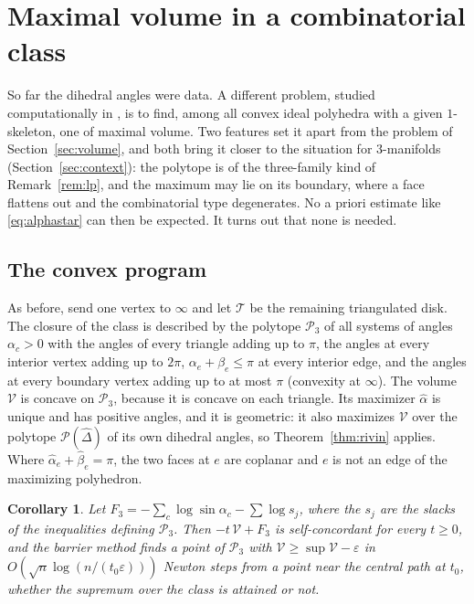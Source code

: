 \documentclass[11pt]{amsart}
\newtheorem{corollary}[theorem]{Corollary}
\theoremstyle{definition}
\theoremstyle{remark}
\newcommand{\cT}{\mathcal{T}}
\newcommand{\eps}{\varepsilon}
\begin{document}
\section{Maximal volume in a combinatorial class}\label{sec:maxvol}

So far the dihedral angles were data. A different problem, studied computationally in \cite{Riv25}, is to find, among all convex ideal polyhedra with a given $1$-skeleton, one of maximal volume.
Two features set it apart from the problem of Section~\ref{sec:volume}, and both bring it closer to the situation for $3$-manifolds (Section~\ref{sec:context}): the polytope is of the three-family kind of Remark~\ref{rem:lp}, and the maximum may lie on its boundary, where a face flattens out and the combinatorial type degenerates.
No a priori estimate like \eqref{eq:alphastar} can then be expected. It turns out that none is needed.

\subsection{The convex program}
As before, send one vertex to $\infty$ and let $\cT$ be the remaining triangulated disk. The closure of the class is described by the polytope $\mathcal P_3$ of all systems of angles $\alpha_c>0$ with the angles of every triangle adding up to $\pi$, the angles at every interior vertex adding up to $2\pi$,
$\alpha_e+\beta_e\le\pi$ at every interior edge, and the angles at every boundary vertex adding up to at most $\pi$ (convexity at $\infty$). The volume $\mathcal V$ is concave on $\mathcal P_3$, because it is concave on each triangle.
Its maximizer $\hat\alpha$ is unique and has positive angles, and it is geometric: it also maximizes $\mathcal V$ over the polytope $\mathcal P(\hat\Delta)$ of its own dihedral angles, so Theorem~\ref{thm:rivin} applies. Where $\hat\alpha_e+\hat\beta_e=\pi$, the two faces at $e$ are coplanar and $e$ is not an edge of the maximizing polyhedron.

\begin{corollary}\label{cor:maxvol}
Let $F_3=-\sum_c\log\sin\alpha_c-\sum\log s_j$, where the $s_j$ are the slacks of the inequalities defining $\mathcal P_3$. Then $-t\,\mathcal V+F_3$ is self-concordant for every $t\ge0$, and the barrier method finds a point of $\mathcal P_3$ with $\mathcal V\ge\sup\mathcal V-\eps$ in
$O(\sqrt n\log(n/(t_0\eps)))$ Newton steps from a point near the central path at $t_0$, whether the supremum over the class is attained or not.
\end{corollary}
\end{document}
